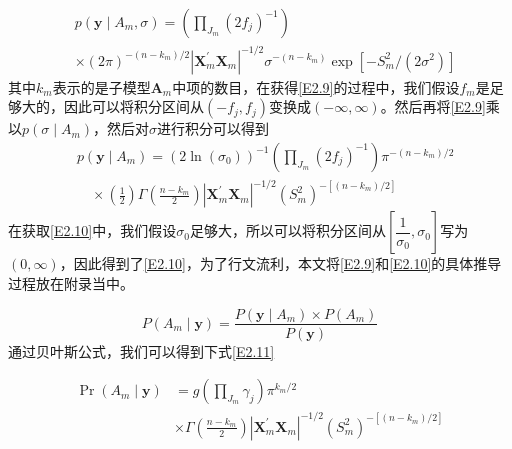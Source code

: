 \documentclass[12pt]{article} %
\begin{document}
	\begin{equation}
		\begin{aligned}
			&p\left(\mathbf{y} \mid A_{m}, \sigma\right)=\left(\prod_{J_{m}}\left(2 f_{j}\right)^{-1}\right) \\
			&\times(2 \pi)^{-\left(n-k_{m}\right) / 2}\left|\mathbf{X}_{m}^{\prime} \mathbf{X}_{m}\right|^{-1 / 2} \sigma^{-\left(n-k_{m}\right)} \exp \left[-S_{m}^{2} /\left(2 \sigma^{2}\right)\right] \label{E2.9}
		\end{aligned}
	\end{equation}
	其中$k_m$表示的是子模型$\mathbf{A}_m$中项的数目，在获得\eqref{E2.9}的过程中，我们假设$f_m$是足够大的，因此可以将积分区间从$(-f_j,f_j)$变换成$(-\infty,\infty)$\cite{mitchell1988bayesian}。然后再将\eqref{E2.9}乘以$p(\sigma \mid A_m)$，然后对$\sigma$进行积分可以得到
	\begin{equation}
		\begin{aligned}
			&p\left(\mathbf{y} \mid A_{m}\right)=\left(2 \ln \left(\sigma_{0}\right)\right)^{-1}\left(\prod_{J_{m}}\left(2 f_{j}\right)^{-1}\right) \pi^{-\left(n-k_{m}\right) / 2} \\
			&\quad \times\left(\frac{1}{2}\right) \Gamma\left(\frac{n-k_{m}}{2}\right)\left|\mathbf{X}_{m}^{\prime} \mathbf{X}_{m}\right|^{-1 / 2}\left(S_{m}^{2}\right)^{-\left[\left(n-k_{m}\right) / 2\right]} \label{E2.10}
		\end{aligned}
	\end{equation}
	在获取\eqref{E2.10}中，我们假设$\sigma_0$足够大，所以可以将积分区间从$[\dfrac{1}{\sigma_0},\sigma_0]$写为$(0,\infty)$\cite{mitchell1988bayesian}，因此得到了\eqref{E2.10}，为了行文流利，本文将\eqref{E2.9}和\eqref{E2.10}的具体推导过程放在附录当中。
	
	\begin{equation*}
		P(A_m \mid \mathbf{y})=\dfrac{P(\mathbf{y} \mid A_m) \times P(A_m)}{P(\mathbf{y})}
	\end{equation*}
	通过贝叶斯公式，我们可以得到下式\eqref{E2.11}
	
	
	\begin{equation}
		\begin{aligned}
			\operatorname{Pr}\left(A_{m} \mid \mathbf{y}\right) &=g\left(\prod_{J_{m}} \gamma_{j}\right) \pi^{k_{m} / 2} \\
			& \times \Gamma\left(\frac{n-k_{m}}{2}\right)\left|\mathbf{X}_{m}^{\prime} \mathbf{X}_{m}\right|^{-1 / 2}\left(S_{m}^{2}\right)^{-\left[\left(n-k_{m}\right) / 2\right]} \label{E2.11}
		\end{aligned}
	\end{equation}
	
\end{document}
